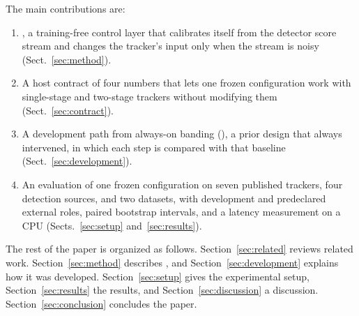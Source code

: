 The main contributions are:
\begin{enumerate}
\item \scl{}, a training-free control layer that calibrates itself from the detector
      score stream and changes the tracker's input only when the stream is
      noisy (Sect.~\ref{sec:method}).
\item A host contract of four numbers that lets one frozen configuration work
      with single-stage and two-stage trackers
      without modifying them (Sect.~\ref{sec:contract}).
\item A development path from always-on banding (\aob{}), a prior design that
      always intervened, in which
      each step is compared with that baseline (Sect.~\ref{sec:development}).
\item An evaluation of one frozen configuration on seven published trackers,
      four detection sources, and two datasets, with development and
      predeclared external roles, paired bootstrap intervals, and a
      latency measurement on a CPU (Sects.~\ref{sec:setup}
      and~\ref{sec:results}).
\end{enumerate}

The rest of the paper is organized as follows. Section~\ref{sec:related}
reviews related work. Section~\ref{sec:method} describes \scl{}, and
Section~\ref{sec:development} explains how it was developed.
Section~\ref{sec:setup} gives the experimental setup,
Section~\ref{sec:results} the results, and Section~\ref{sec:discussion} a
discussion. Section~\ref{sec:conclusion} concludes the paper.
